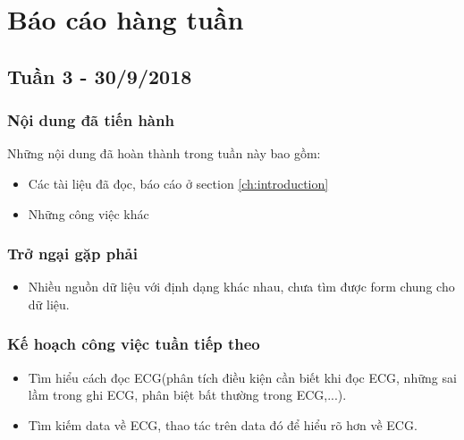 \chapter*{Báo cáo hàng tuần}
\section{Tuần 3 - 30/9/2018}
\subsection{Nội dung đã tiến hành}
Những nội dung đã hoàn thành trong tuần này bao gồm:
\begin{itemize}
\item Các tài liệu đã đọc, báo cáo ở section \ref{ch:introduction}
\item Những công việc khác
\end{itemize}

\subsection{Trở ngại gặp phải}
\begin{itemize}
    \item Nhiều nguồn dữ liệu với định dạng khác nhau, chưa tìm được form chung cho dữ liệu.
\end{itemize}

\subsection{Kế hoạch công việc tuần tiếp theo}
\begin{itemize}
    \item Tìm hiểu cách đọc ECG(phân tích điều kiện cần biết khi đọc ECG, những sai lầm trong ghi ECG, phân biệt bất thường trong ECG,...).
    \item Tìm kiếm data về ECG, thao tác trên data đó để  hiểu rõ hơn về ECG.
\end{itemize}
